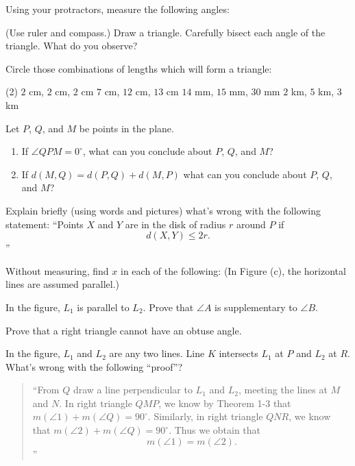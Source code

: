 \documentclass[12pt]{book} %
\begin{document}
\begin{ExerciseList}
	\Exercise Using your protractors, measure the following angles:
	
	
	\Exercise (Use ruler and compass.) Draw a triangle. Carefully bisect each angle of the triangle. What do you observe?
	
	\Exercise Circle those combinations of lengths which will form a triangle:
	\begin{tasks}(2)
		\task[(a)] $2$ cm, $2$ cm, $2$ cm
		\task[(b)] $7$ cm, $12$ cm, $13$ cm
		\task[(c)] $14$ mm, $15$ mm, $30$ mm
		\task[(d)] $2$ km, $5$ km, $3$ km
	\end{tasks}
	
	\Exercise Let $P$, $Q$, and $M$ be points in the plane.
	\begin{enumerate}
		\item[(a)] If $\angle QPM=0^\circ$, what can you conclude about $P$, $Q$, and $M$?
		\item[(b)] If $d(M,Q)=d(P,Q)+d(M,P)$ what can you conclude about $P$, $Q$, and $M$?
	\end{enumerate}
	
	\Exercise Explain briefly (using words and pictures) what's wrong with the following statement: ``Points $X$ and $Y$ are in the disk of radius $r$ around $P$ if
	\[
	d(X,Y)\le 2r.
	\]
	''
	
	\Exercise Without measuring, find $x$ in each of the following:
	(In Figure (c), the horizontal lines are assumed parallel.)
	
	
	\Exercise In the figure, $L_1$ is parallel to $L_2$. Prove that $\angle A$ is supplementary to $\angle B$.
	
\end{ExerciseList}

\begin{ExerciseList}
	\Exercise Prove that a right triangle cannot have an obtuse angle.
	
	\Exercise In the figure, $L_1$ and $L_2$ are any two lines. Line $K$ intersects $L_1$ at $P$ and $L_2$ at $R$. What's wrong with the following ``proof''?
	
	\begin{quote}
		``From $Q$ draw a line perpendicular to $L_1$ and $L_2$, meeting the lines at $M$ and $N$. In right triangle $QMP$, we know by Theorem 1-3 that $m(\angle 1)+m(\angle Q)=90^\circ$. Similarly, in right triangle $QNR$, we know that $m(\angle 2)+m(\angle Q)=90^\circ$. Thus we obtain that
		\[
		m(\angle 1)=m(\angle 2).
		\]
		''
	\end{quote}
	
\end{ExerciseList}
\end{document}
